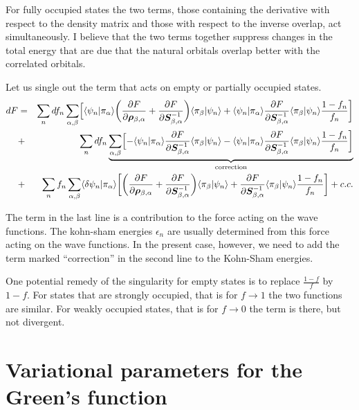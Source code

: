 \documentclass[11pt,a4paper]{report}
\begin{document}
For fully occupied states the two terms, those containing the
derivative with respect to the density matrix and those with respect
to the inverse overlap, act simultaneously. I believe that the two
terms together suppress changes in the total energy that are due that
the natural orbitals overlap better with the correlated orbitals.

Let us single out the term that acts on empty or partially occupied
states.
\begin{eqnarray}
dF&=&
\sum_n df_n
\sum_{\alpha,\beta}
\Bigl[
\langle\psi_n|\pi_\alpha\rangle
\biggl(
\frac{\partial F}{\partial\bm{\rho}_{\beta,\alpha}}
+\frac{\partial F}{\partial\bm{S}^{-1}_{\beta,\alpha}}\biggr)
\langle\pi_\beta|\psi_n\rangle
+\langle\psi_n|\pi_\alpha\rangle
\frac{\partial F}{\partial\bm{S}^{-1}_{\beta,\alpha}}
\langle\pi_\beta|\psi_n\rangle\frac{1-f_n}{f_n}\biggr]
\nonumber\\
&+&\sum_n df_n
\underbrace{\sum_{\alpha,\beta}
\Bigl[-\langle\psi_n|\pi_\alpha\rangle
\frac{\partial F}{\partial\bm{S}^{-1}_{\beta,\alpha}}
\langle\pi_\beta|\psi_n\rangle
-\langle\psi_n|\pi_\alpha\rangle
\frac{\partial F}{\partial\bm{S}^{-1}_{\beta,\alpha}}
\langle\pi_\beta|\psi_n\rangle\frac{1-f_n}{f_n}\biggr]}_{\text{correction}}
\nonumber\\
&+&\sum_nf_n\sum_{\alpha,\beta}\langle\delta\psi_n|\pi_\alpha\rangle
\biggl[
\biggl(\frac{\partial F}{\partial\bm{\rho}_{\beta,\alpha}}
+\frac{\partial F}{\partial\bm{S}^{-1}_{\beta,\alpha}}\biggr)
\langle\pi_\beta|\psi_n\rangle
+\frac{\partial F}{\partial\bm{S}^{-1}_{\beta,\alpha}}
\langle\pi_\beta|\psi_n\rangle\frac{1-f_n}{f_n}\biggr]+c.c.
\nonumber\\
\end{eqnarray}

The term in the last line is a contribution to the force acting on the
wave functions. The kohn-sham energies $\epsilon_n$ are usually
determined from this force acting on the wave functions. In the
present case, however, we need to add the term marked ``correction''
in the second line to the Kohn-Sham energies.

One potential remedy of the singularity for empty states is to replace
$\frac{1-f}{f}$ by $1-f$. For states that are strongly occupied, that
is for $f\rightarrow 1$ the two functions are similar. For weakly
occupied states, that is for $f\rightarrow0$ the term is there, but
not divergent.


\section{Variational parameters for the Green's function}
\end{document}
